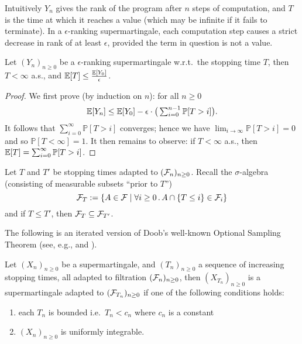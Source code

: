 Intuitively $Y_n$ gives the rank of the program after $n$ steps of computation, and $T$ is the time at which it reaches a value (which may be infinite if it fails to terminate).
In a $\epsilon$-ranking supermartingale, each computation step causes a strict decrease in rank of at least $\epsilon$, provided the term in question is not a value.

\begin{lemma}%
\label{lem:rank-PAST}
Let $(Y_n)_{n \geq 0}$ be a $\epsilon$-ranking supermartingale w.r.t.~the stopping time $T$, then $T < \infty$ a.s., and $\mathbb{E}[T] \leq \frac{\mathbb{E}[Y_0]}{\epsilon}$.
\end{lemma}

\begin{proof}
We first prove (by induction on $n$): for all $n \geq 0$
\[
\mathbb{E}[Y_n] \leq \mathbb{E}[Y_0] - \epsilon \cdot \big(\textstyle\sum_{i=0}^{n-1} \mathbb{P}[T > i]\big).
\]
It follows that $\sum_{i=0}^{\infty} \mathbb{P}[T > i]$ converges; hence we have $\lim_{i \to \infty} \mathbb{P}[T > i] = 0$ and so $\mathbb{P}[T < \infty] = 1$.
It then remains to observe: if $T < \infty$ a.s., then $\mathbb{E}[T] = \sum^\infty_{i=0} \mathbb{P}[T > i]$.
\end{proof}

\begin{remark}
\end{remark}

Let $T$ and $T'$ be stopping times adapted to $(\mathcal{F}_n)_{n \geq 0}$.
Recall the $\sigma$-algebra (consisting of measurable subsets ``prior to $T$'')
\[
\mathcal{F}_T := \{A \in \mathcal{F} \mid \forall i \geq 0 \, . \, A \cap \{T \leq i\} \in \mathcal{F}_i\}
\]
and if $T \leq T'$, then $\mathcal{F}_{T} \subseteq \mathcal{F}_{T'}$.

The following is an iterated version of Doob's well-known Optional Sampling Theorem (see, e.g., \cite[\S 6.7]{AshDD00} and \cite[Thm.~7.2]{DBLP:conf/popl/FioritiH15}).
\begin{theorem}
\label{thm:optional sampling}
Let $(X_n)_{n \geq 0}$ be a supermartingale, and $(T_n)_{n \geq 0}$ a sequence of increasing stopping times, all adapted to filtration $(\mathcal{F}_n)_{n \geq 0}$, then $(X_{T_n})_{n \geq 0}$ is a supermartingale adapted to $(\mathcal{F}_{T_n})_{n \geq 0}$ if one of the following conditions holds:
\begin{enumerate}
\item each $T_n$ is bounded i.e.~$T_n < c_n$ where $c_n$ is a constant
\item $(X_n)_{n \geq 0}$ is uniformly integrable.
\end{enumerate}
\end{theorem}

